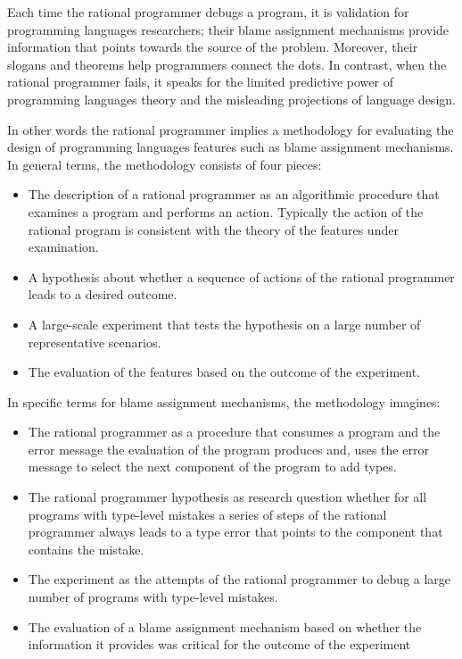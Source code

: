 
Each time the rational programmer debugs a program, it is
validation for programming languages researchers; their blame assignment 
mechanisms provide information that points towards the source of the
problem. Moreover, their slogans and theorems help programmers connect the dots.
In contrast, when the rational programmer fails, it speaks for the
limited predictive power of programming languages theory and the
misleading projections of language design.

In other words the rational programmer implies a methodology for
evaluating
the design of programming languages features such as blame assignment mechanisms. 
In general terms, the methodology consists of four 
pieces:

\begin{itemize} 

\item The description of a  rational programmer as an algorithmic
  procedure that examines a program and performs an action. 
    Typically the action of the rational program is consistent 
   with the theory of the features under examination.

  \item A hypothesis about whether a sequence of actions of the
    rational programmer leads to a desired outcome. 
 
\item A large-scale experiment that tests the hypothesis 
  on a large number of representative scenarios. 


\item The evaluation of the features based on the outcome of the
  experiment.    

\end{itemize}

In specific terms for blame assignment mechanisms, the methodology
imagines:  

\begin{itemize}
\item The rational programmer as a procedure that consumes a program and the error message 
  the evaluation of the program produces and, uses the error message to
    select the next component of the program to add types.

  \item The rational programmer hypothesis as  research question whether 
    for all programs with
    type-level mistakes a series of steps of the rational programmer always leads to a type
    error that points to the component that contains the mistake. 

\item The experiment as the attempts of the rational programmer to debug a
  large number of programs with type-level mistakes. 


\item The evaluation of a blame assignment mechanism based on whether the
  information it provides was critical for the outcome of the experiment   
\end{itemize}




